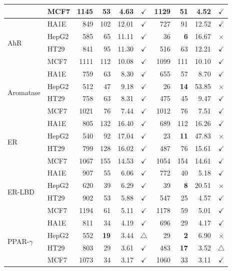 \documentclass[11pt,a4paper]{article}
\begin{document}
\begin{landscape}
\begin{table}[p]
\begin{tabular*}{\linewidth}{@{\extracolsep{\fill}}ll|rrrcrrrc@{}}
 & MCF7 & 1145 & 53 & 4.63 & \(\checkmark\) & 1129 & 51 & 4.52 & \(\checkmark\) \\
\midrule
\multirow[c]{4}{*}{AhR} & HA1E & 849 & 102 & 12.01 & \(\checkmark\) & 727 & 91 & 12.52 & \(\checkmark\) \\
 & HepG2 & 585 & 65 & 11.11 & \(\checkmark\) & 36 & \textbf{6} & 16.67 & \(\times\) \\
 & HT29 & 841 & 95 & 11.30 & \(\checkmark\) & 516 & 63 & 12.21 & \(\checkmark\) \\
 & MCF7 & 1111 & 112 & 10.08 & \(\checkmark\) & 1099 & 111 & 10.10 & \(\checkmark\) \\
\midrule
\multirow[c]{4}{*}{Aromatase} & HA1E & 759 & 63 & 8.30 & \(\checkmark\) & 655 & 57 & 8.70 & \(\checkmark\) \\
 & HepG2 & 512 & 47 & 9.18 & \(\checkmark\) & 26 & \textbf{14} & 53.85 & \(\times\) \\
 & HT29 & 758 & 63 & 8.31 & \(\checkmark\) & 475 & 45 & 9.47 & \(\checkmark\) \\
 & MCF7 & 1021 & 76 & 7.44 & \(\checkmark\) & 1012 & 76 & 7.51 & \(\checkmark\) \\
\midrule
\multirow[c]{4}{*}{ER} & HA1E & 805 & 132 & 16.40 & \(\checkmark\) & 689 & 112 & 16.26 & \(\checkmark\) \\
 & HepG2 & 540 & 92 & 17.04 & \(\checkmark\) & 23 & \textbf{11} & 47.83 & \(\times\) \\
 & HT29 & 799 & 128 & 16.02 & \(\checkmark\) & 487 & 76 & 15.61 & \(\checkmark\) \\
 & MCF7 & 1067 & 155 & 14.53 & \(\checkmark\) & 1054 & 154 & 14.61 & \(\checkmark\) \\
\midrule
\multirow[c]{4}{*}{ER-LBD} & HA1E & 907 & 55 & 6.06 & \(\checkmark\) & 772 & 40 & 5.18 & \(\checkmark\) \\
 & HepG2 & 620 & 39 & 6.29 & \(\checkmark\) & 39 & \textbf{8} & 20.51 & \(\times\) \\
 & HT29 & 902 & 53 & 5.88 & \(\checkmark\) & 547 & 25 & 4.57 & \(\checkmark\) \\
 & MCF7 & 1194 & 61 & 5.11 & \(\checkmark\) & 1178 & 59 & 5.01 & \(\checkmark\) \\
\midrule
\multirow[c]{4}{*}{PPAR-\(\gamma\)} & HA1E & 811 & 34 & 4.19 & \(\checkmark\) & 696 & 29 & 4.17 & \(\checkmark\) \\
 & HepG2 & 552 & \textbf{19} & 3.44 & \(\triangle\) & 29 & \textbf{2} & 6.90 & \(\times\) \\
 & HT29 & 803 & 29 & 3.61 & \(\checkmark\) & 483 & \textbf{17} & 3.52 & \(\triangle\) \\
 & MCF7 & 1073 & 34 & 3.17 & \(\checkmark\) & 1060 & 33 & 3.11 & \(\checkmark\) \\
\bottomrule
\end{tabular*}
\end{table}
\endgroup
\end{landscape}
\clearpage
\end{document}
